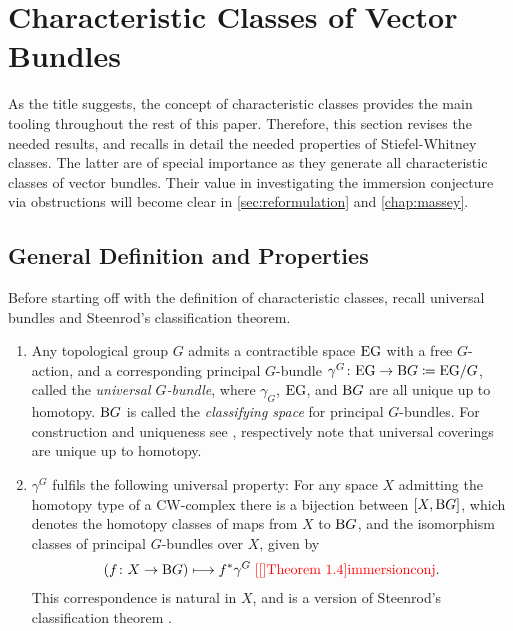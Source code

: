 \section{Characteristic Classes of Vector Bundles}\label{sec:charclsofvb}
As the title suggests, the concept of characteristic classes provides the
main tooling throughout the rest of this paper. Therefore, this section
revises the needed results, and recalls in detail the needed properties
of Stiefel-Whitney classes. The latter are of special importance as
they generate all characteristic classes of vector bundles.
Their value in investigating the immersion conjecture via obstructions
will become clear in \autoref{sec:reformulation} and \autoref{chap:massey}.

\subsection{General Definition and Properties}
Before starting off with the definition of characteristic classes,
recall universal bundles and Steenrod's classification theorem.
\begin{LemDef}\label{def:charcls}
  \begin{enumerate}
  \item Any topological group $G$ admits a contractible space $\mathrm{E}\mathrm{G}$ with a
    free $G$-action, and a corresponding principal $G$-bundle
    $\gamma^G\colon \mathrm{E}\mathrm{G}\to\mathrm{B}G\coloneqq \mathrm{E}\mathrm{G}/G$, called the
    \emph{universal $G$-bundle},
    where $\gamma_G$, $\mathrm{E}\mathrm{G}$, and $\mathrm{B}G$ are all unique up to
    homotopy.
    $\mathrm{B}G$ is called the \emph{classifying space} for principal
    $G$-bundles.
    For construction and uniqueness see \cite[Example~1B.7~ff.]{hatcher},
    respectively note that universal coverings are unique up to homotopy.
  \item\label{item:classificationthm}
    $\gamma^G$ fulfils the following universal property:
    For any space $X$ admitting the homotopy type of a CW-complex
    there is a bijection between $[X,\mathrm{B}G]$, which denotes the homotopy
    classes of maps from $X$ to $\mathrm{B}G$, and the isomorphism classes of
    principal $G$-bundles over $X$, given by
    \begin{gather*}
      \left(f\colon X\to\BG \right) \longmapsto \pb f \gamma^G
      \;
      \text{\optcite[Theorem 1.4]{immersionconj}}.
    \end{gather*}
    This correspondence is natural in $X$, and is a version of
    Steenrod's classification theorem
    \cite[Theorem~14.4.1]{tomdieck}.
  \end{enumerate}
\end{LemDef}
